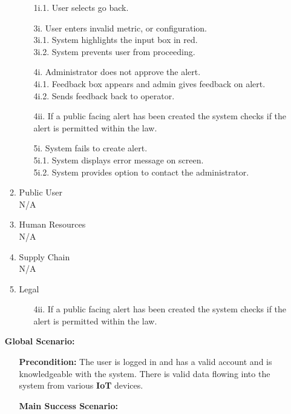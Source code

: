 \documentclass[]{article}
\begin{document}
\begin{enumerate}[{\bf BE1.}]
\begin{enumerate}[{\bf VP1.}]
\begin{itemize}
				\hspace{1cm}1i.1. User selects go back.
				\item[3i.] User enters invalid metric, or configuration. \\
				\hspace{1cm}3i.1. System highlights the input box in red. \\
				\hspace{1cm}3i.2. System prevents user from proceeding.
				\item[4i.] Administrator does not approve the alert. \\
				\hspace{1cm}4i.1. Feedback box appears and admin gives feedback on alert. \\
				\hspace{1cm}4i.2. Sends feedback back to operator.
				\item[4ii.] If a public facing alert has been created the system checks if the alert is permitted within the law.
				\item[5i.] System fails to create alert. \\
				\hspace{1cm}5i.1. System displays error message on screen. \\
				\hspace{1cm}5i.2. System provides option to contact the administrator.
			\end{itemize}
		\item Public User \\
			N/A
		\item Human Resources \\
			N/A
		\item Supply Chain \\
			N/A
		\item Legal
			\begin{itemize}
				\item[4ii.] If a public facing alert has been created the system checks if the alert is permitted within the law.
			\end{itemize}
		\end{enumerate}
		{\bf Global Scenario:}
		\begin{itemize}
			\item[] {\bf Precondition:} The user is logged in and has a valid account and is knowledgeable with the system. There is valid data flowing into the system from various \textbf{IoT} devices.
			\item[] {\bf Main Success Scenario:}
		\end{itemize}

\end{enumerate}
\end{document}
